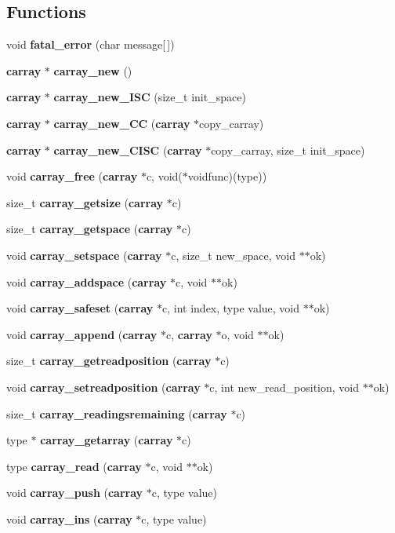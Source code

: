 \subsection*{Functions}
\begin{DoxyCompactItemize}
\item 
void {\bf fatal\+\_\+error} (char message[$\,$])
\item 
{\bf carray} $\ast$ {\bf carray\+\_\+new} ()
\item 
{\bf carray} $\ast$ {\bf carray\+\_\+new\+\_\+\+I\+SC} (size\+\_\+t init\+\_\+space)
\item 
{\bf carray} $\ast$ {\bf carray\+\_\+new\+\_\+\+CC} ({\bf carray} $\ast$copy\+\_\+carray)
\item 
{\bf carray} $\ast$ {\bf carray\+\_\+new\+\_\+\+C\+I\+SC} ({\bf carray} $\ast$copy\+\_\+carray, size\+\_\+t init\+\_\+space)
\item 
void {\bf carray\+\_\+free} ({\bf carray} $\ast$c, void($\ast$voidfunc)(type))
\item 
size\+\_\+t {\bf carray\+\_\+getsize} ({\bf carray} $\ast$c)
\item 
size\+\_\+t {\bf carray\+\_\+getspace} ({\bf carray} $\ast$c)
\item 
void {\bf carray\+\_\+setspace} ({\bf carray} $\ast$c, size\+\_\+t new\+\_\+space, void $\ast$$\ast$ok)
\item 
void {\bf carray\+\_\+addspace} ({\bf carray} $\ast$c, void $\ast$$\ast$ok)
\item 
void {\bf carray\+\_\+safeset} ({\bf carray} $\ast$c, int index, type value, void $\ast$$\ast$ok)
\item 
void {\bf carray\+\_\+append} ({\bf carray} $\ast$c, {\bf carray} $\ast$o, void $\ast$$\ast$ok)
\item 
size\+\_\+t {\bf carray\+\_\+getreadposition} ({\bf carray} $\ast$c)
\item 
void {\bf carray\+\_\+setreadposition} ({\bf carray} $\ast$c, int new\+\_\+read\+\_\+position, void $\ast$$\ast$ok)
\item 
size\+\_\+t {\bf carray\+\_\+readingsremaining} ({\bf carray} $\ast$c)
\item 
type $\ast$ {\bf carray\+\_\+getarray} ({\bf carray} $\ast$c)
\item 
type {\bf carray\+\_\+read} ({\bf carray} $\ast$c, void $\ast$$\ast$ok)
\item 
void {\bf carray\+\_\+push} ({\bf carray} $\ast$c, type value)
\item 
void {\bf carray\+\_\+ins} ({\bf carray} $\ast$c, type value)

\end{DoxyCompactItemize}
